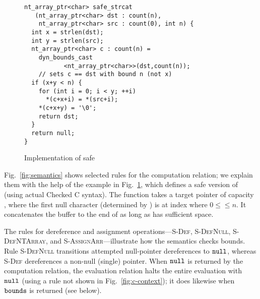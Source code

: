 

\begin{figure}[t]
{\small
{\captionsetup[lstlisting]{margin = 8 mm}
  \begin{lstlisting}[xleftmargin=8 mm]
nt_array_ptr<char> safe_strcat
   (nt_array_ptr<char> dst : count(n),
    nt_array_ptr<char> src : count(0), int n) {
  int x = strlen(dst);
  int y = strlen(src);
  nt_array_ptr<char> c : count(n) =
    dyn_bounds_cast
           <nt_array_ptr<char>>(dst,count(n));
    // sets c == dst with bound n (not x)
  if (x+y < n) {
    for (int i = 0; i < y; ++i)
      *(c+x+i) = *(src+i);
    *(c+x+y) = '\0';
    return dst;
  }
  return null;
}
  \end{lstlisting}
}
}
\caption{Implementation of safe }
\label{fig:strcat-ex}
\end{figure}

Fig.~\ref{fig:semantics} shows selected rules for the computation
relation; we explain them with the help of the example in
Fig.~\ref{fig:strcat-ex},
  which defines a 
  safe version of  (using actual Checked C syntax).  The
  function takes a target 
  pointer  of capacity , where the first null
  character (determined by ) is at index  where
  $0 \leq $$ \leq n$. It concatenates the  buffer to
  the end of  as long as  has sufficient space.


%
The rules for dereference and assignment operations---\textsc{S-Def},
\textsc{S-DefNull}, \textsc{S-DefNTArray}, and
\textsc{S-AssignArr}---illustrate how the semantics checks bounds.
Rule \textsc{S-DefNull} transitions attempted null-pointer
dereferences to $\mathtt{null}$, whereas \textsc{S-Def} dereferences a
non-null (single) pointer.
  When $\mathtt{null}$ is returned by the
computation relation, the evaluation relation halts the entire
evaluation with $\mathtt{null}$ (using a rule not shown in Fig.~\ref{fig:c-context}); it
does likewise when $\mathtt{bounds}$ is returned (see below).

